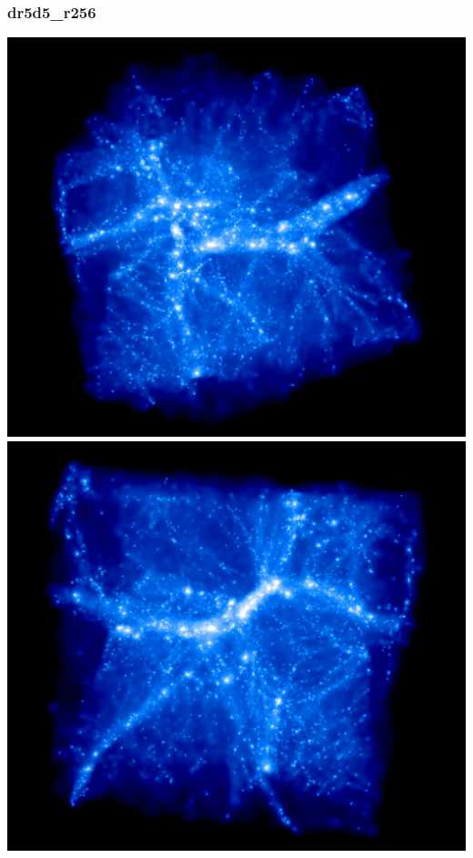 \subsubsection{dr5d5\_r256}
\includegraphics[scale=0.12]{r256/h100/dr5d5_r256/rotate_00188.jpg} 
\includegraphics[scale=0.12]{r256/h100/dr5d5_r256/rotate_00320.jpg} \\
